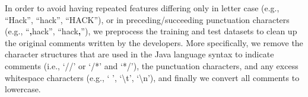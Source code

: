 In order to avoid having repeated features differing only in letter case (e.g., ``Hack'', ``hack'', ``HACK''), or in preceding/succeeding punctuation characters (e.g., ``\textbf{,}hack'', ``hack\textbf{,}''), we preprocess the training and test datasets to clean up the original comments written by the developers. More specifically, we remove the character structures that are used in the Java language syntax to indicate comments (i.e., `//' or `/*' and `*/'), the punctuation characters, and any excess whitespace characters (e.g., ` ', `\textbackslash t', `\textbackslash n'), and finally we convert all comments to lowercase.